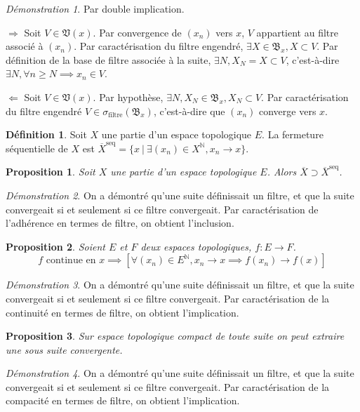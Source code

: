 \documentclass[a4paper, 11pt, french]{book}
\newenvironment{itemise}{\itemize}{\enditemize}
\theoremstyle{plain} %
\newtheorem{proposition}{Proposition}
\theoremstyle{definition} %
\newtheorem{definition}{Définition}
\theoremstyle{remark} %
\newtheorem*{demonstration}{Démonstration}
\newcommand{\1}{\mathds{1}}
\newcommand{\N}{\mathbb{N}}
\renewcommand{\frak}[1]{\mathfrak{#1}}
\renewcommand{\rm}[1]{\mathrm{#1}}
\newcommand\ens[2]{\{#1 \ |\ #2\}}
\newcommand\equivalence[3]{
	\begin{demonstration}
		#1
		\begin{itemise}
			\item[$\Longrightarrow$] #2
			\item[$\Longleftarrow$] #3
		\end{itemise}
	\end{demonstration}
}
\begin{document}
\equivalence{Par double implication.}{
	Soit $V\in\frak{V}(x)$.
	Par convergence de $(x_n)$ vers $x$, $V$ appartient au filtre associé à $(x_n)$.
	Par caractérisation du filtre engendré, $\exists X\in\frak{B}_x, X\subset V$.
	Par définition de la base de filtre associée à la suite, $\exists N, X_N=X\subset V$, c'est-à-dire $\exists N, \forall n\geqslant N\implies x_n\in V$.
}{
	Soit $V\in\frak{V}(x)$.
	Par hypothèse, $\exists N, X_N\in\frak{B}_x, X_N\subset V$.
	Par caractérisation du filtre engendré $V\in\sigma_\rm{filtre}(\frak{B}_x)$, c'est-à-dire que $(x_n)$ converge vers $x$.	
}

\begin{definition}
	Soit $X$ une partie d'un espace topologique $E$.
	La fermeture séquentielle de $X$ est $\overline{X}^\rm{seq}=\ens{x}{\exists(x_n)\in X^\N, x_n\rightarrow x}$.
\end{definition}

\begin{proposition}
	Soit $X$ une partie d'un espace topologique $E$.
	Alors $\overline{X}\supset\overline{X}^\rm{seq}$.
\end{proposition}

\begin{demonstration}
	On a démontré qu'une suite définissait un filtre, et que la suite convergeait si et seulement si ce filtre convergeait.
	Par caractérisation de l'adhérence en termes de filtre, on obtient l'inclusion.
\end{demonstration}

\begin{proposition}
	Soient $E$ et $F$ deux espaces topologiques, $f:E\rightarrow F$.
	$$
		\text{$f$ continue en $x$}
		\implies
		\left[\forall(x_n)\in E^\N, x_n\rightarrow x\implies f(x_n)\rightarrow f(x)\right]
	$$
\end{proposition}

\begin{demonstration}
	On a démontré qu'une suite définissait un filtre, et que la suite convergeait si et seulement si ce filtre convergeait.
	Par caractérisation de la continuité en termes de filtre, on obtient l'implication.
\end{demonstration}

\begin{proposition}
	Sur espace topologique compact de toute suite on peut extraire une sous suite convergente.
\end{proposition}

\begin{demonstration}
	On a démontré qu'une suite définissait un filtre, et que la suite convergeait si et seulement si ce filtre convergeait.
	Par caractérisation de la compacité en termes de filtre, on obtient l'implication.
\end{demonstration}
\end{document}
